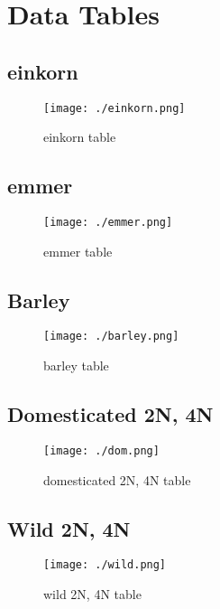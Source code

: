 \documentclass[a4paper, twocolumn]{article}
\begin{document}
\section{Data Tables}
\label{sec:org52c1b02}

\subsection{einkorn}
\label{sec:orgfeab4c0}
\begin{figure}[htbp]
\centering
\texttt{[image: ./einkorn.png]}
\caption{\label{fig:org88202ae}
einkorn table}
\end{figure}


\subsection{emmer}
\label{sec:org5520210}
\begin{figure}[htbp]
\centering
\texttt{[image: ./emmer.png]}
\caption{\label{fig:orgaf39bca}
emmer table}
\end{figure}

\clearpage


\subsection{Barley}
\label{sec:org3dfe9c1}
\begin{figure}[htbp]
\centering
\texttt{[image: ./barley.png]}
\caption{\label{fig:org1a1c6bb}
barley table}
\end{figure}


\subsection{Domesticated 2N, 4N}
\label{sec:org00a1194}
\begin{figure}[htbp]
\centering
\texttt{[image: ./dom.png]}
\caption{\label{fig:org0e66e7f}
domesticated 2N, 4N table}
\end{figure}

\clearpage
\subsection{Wild 2N, 4N}
\label{sec:orge643028}
\begin{figure}[htbp]
\centering
\texttt{[image: ./wild.png]}
\caption{\label{fig:org599ad24}
wild 2N, 4N  table}
\end{figure}

\clearpage



\end{document}
